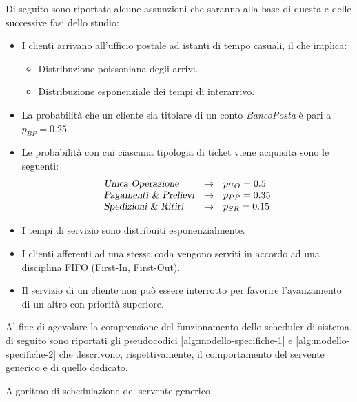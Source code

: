 Di seguito sono riportate alcune assunzioni che saranno alla base di questa e delle successive fasi dello studio:
\begin{itemize}
\item I clienti arrivano all'ufficio postale ad istanti di tempo casuali, il che implica:
\begin{itemize}
\item Distribuzione poissoniana degli arrivi.
\item Distribuzione esponenziale dei tempi di interarrivo.
\end{itemize}
\item La probabilità che un cliente sia titolare di un conto \textsl{BancoPosta} è pari a $p_{BP} = 0.25$.
\item Le probabilità con cui ciascuna tipologia di ticket viene acquisita sono le seguenti:
\begin{equation*}
\begin{array}{l c l}
\textsl{Unica Operazione}{} & \rightarrow & p_{UO} = 0.5 \\
\textsl{Pagamenti \& Prelievi}{} & \rightarrow & p_{PP} = 0.35 \\
\textsl{Spedizioni \& Ritiri}{} & \rightarrow & p_{SR} = 0.15
\end{array}
\end{equation*} 
\item I tempi di servizio sono distribuiti esponenzialmente.
\item I clienti afferenti ad una stessa coda vengono serviti in accordo ad una disciplina FIFO (First-In, First-Out).
\item Il servizio di un cliente non può essere interrotto per favorire l'avanzamento di un altro con priorità superiore.
\end{itemize}

Al fine di agevolare la comprensione del funzionamento dello scheduler di sistema, di seguito sono riportati gli pseudocodici \ref{alg:modello-specifiche-1} e \ref{alg:modello-specifiche-2} che descrivono, rispettivamente, il comportamento del servente generico e di quello dedicato.

\begin{algorithm}[ht]
\SetAlgoLined
{}
\caption{Algoritmo di schedulazione del servente generico}
\label{alg:modello-specifiche-1}
\end{algorithm}

